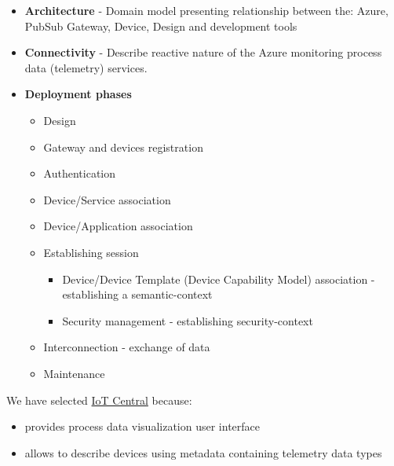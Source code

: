 \documentclass{article}
\providecommand{\tightlist} { \setlength{\itemsep}{0pt}\setlength{\parskip}{0pt}}
\begin{document}
\begin{itemize}
  \tightlist
  \item
        \textbf{Architecture} - Domain model presenting relationship between
        the: Azure, PubSub Gateway, Device, Design and development tools
  \item
        \textbf{Connectivity} - Describe reactive nature of the Azure
        monitoring process data (telemetry) services.
  \item
        \textbf{Deployment phases}

        \begin{itemize}
          \tightlist
          \item
                Design
          \item
                Gateway and devices registration
          \item
                Authentication
          \item
                Device/Service association
          \item
                Device/Application association
          \item
                Establishing session

                \begin{itemize}
                  \tightlist
                  \item
                        Device/Device Template (Device Capability Model) association -
                        establishing a semantic-context
                  \item
                        Security management - establishing security-context
                \end{itemize}
          \item
                Interconnection - exchange of data
          \item
                Maintenance
        \end{itemize}
\end{itemize}

We have selected
\href{https://docs.microsoft.com/azure/iot-central/core/}{IoT Central}
because:

\begin{itemize}
  \tightlist
  \item
        provides process data visualization user interface
  \item
        allows to describe devices using metadata containing telemetry data
        types
\end{itemize}
\end{document}
